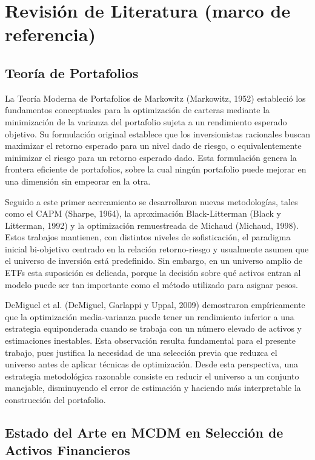 \documentclass[12pt,letterpaper]{article}
\begin{document}
\section{Revisión de Literatura (marco de referencia)}

\subsection{Teoría de Portafolios}

La Teoría Moderna de Portafolios de Markowitz (Markowitz, 1952) estableció los fundamentos conceptuales para la optimización de carteras mediante la minimización de la varianza del portafolio sujeta a un rendimiento esperado objetivo. Su formulación original establece que los inversionistas racionales buscan maximizar el retorno esperado para un nivel dado de riesgo, o equivalentemente minimizar el riesgo para un retorno esperado dado. Esta formulación genera la frontera eficiente de portafolios, sobre la cual ningún portafolio puede mejorar en una dimensión sin empeorar en la otra.

Seguido a este primer acercamiento se desarrollaron nuevas metodologías, tales como el CAPM (Sharpe, 1964), la aproximación Black-Litterman (Black y Litterman, 1992) y la optimización remuestreada de Michaud (Michaud, 1998). Estos trabajos mantienen, con distintos niveles de sofisticación, el paradigma inicial bi-objetivo centrado en la relación retorno-riesgo y usualmente asumen que el universo de inversión está predefinido. Sin embargo, en un universo amplio de ETFs esta suposición es delicada, porque la decisión sobre qué activos entran al modelo puede ser tan importante como el método utilizado para asignar pesos.

DeMiguel et al. (DeMiguel, Garlappi y Uppal, 2009) demostraron empíricamente que la optimización media-varianza puede tener un rendimiento inferior a una estrategia equiponderada cuando se trabaja con un número elevado de activos y estimaciones inestables. Esta observación resulta fundamental para el presente trabajo, pues justifica la necesidad de una selección previa que reduzca el universo antes de aplicar técnicas de optimización. Desde esta perspectiva, una estrategia metodológica razonable consiste en reducir el universo a un conjunto manejable, disminuyendo el error de estimación y haciendo más interpretable la construcción del portafolio.

\subsection{Estado del Arte en MCDM en Selección de Activos Financieros}
\end{document}
